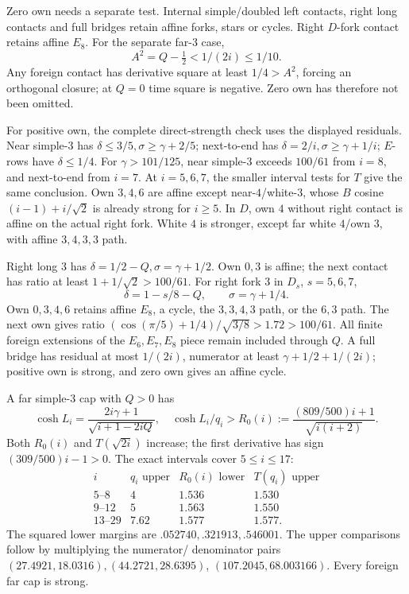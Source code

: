 \documentclass[11pt]{article}
\theoremstyle{definition}
\theoremstyle{remark}
\begin{document}
Zero own needs a separate test. Internal simple/doubled left
contacts, right long contacts and full bridges retain affine
forks, stars or cycles. Right \(D\)-fork contact retains
affine \(E_8\). For the separate far-\(3\) case,
\[
 A^2=Q-\tfrac12<1/(2i)\leq1/10.
\]
Any foreign contact has derivative square at least \(1/4>A^2\),
forcing an orthogonal closure; at \(Q=0\) time square is
negative. Zero own has therefore not been omitted.

For positive own, the complete direct-strength check uses
the displayed residuals. Near simple-\(3\) has
\(\delta\leq3/5,\sigma\geq\gamma+2/5\);
next-to-end has \(\delta=2/i,\sigma\geq\gamma+1/i\);
\(E\)-rows have \(\delta\leq1/4\).
For \(\gamma>101/125\), near simple-\(3\) exceeds
\(100/61\) from \(i=8\), and next-to-end from \(i=7\).
At \(i=5,6,7\), the smaller interval tests for \(T\)
give the same conclusion. Own \(3,4,6\) are affine
except near-\(4\)/white-\(3\), whose \(B\) cosine
\((i-1)+i/\sqrt2\) is already strong for \(i\geq5\).
In \(D\), own \(4\) without right contact is affine on
the actual right fork. White \(4\) is stronger, except
far white \(4\)/own \(3\), with affine \(3,4,3,3\) path.

Right long \(3\) has
\(\delta=1/2-Q,\sigma=\gamma+1/2\).
Own \(0,3\) is affine; the next contact has ratio
at least \(1+1/\sqrt2>100/61\).
For right fork \(3\) in \(D_s\), \(s=5,6,7\),
\[
 \delta=1-s/8-Q,\qquad \sigma=\gamma+1/4.
\]
Own \(0,3,4,6\) retains affine \(E_8\), a cycle,
the \(3,3,4,3\) path, or the \(6,3\) path.
The next own gives ratio
\((\cos(\pi/5)+1/4)/\sqrt{3/8}>1.72>100/61\).
All finite foreign extensions of the \(E_6,E_7,E_8\)
piece remain included through \(Q\).
A full bridge has residual at most \(1/(2i)\),
numerator at least \(\gamma+1/2+1/(2i)\);
positive own is strong, and zero own gives an affine cycle.

A far simple-\(3\) cap with \(Q>0\) has
\[
 \cosh L_i=\frac{2i\gamma+1}{\sqrt{i+1-2iQ}},\quad
 \cosh L_i/q_i>R_0(i)
 :=\frac{(809/500)i+1}{\sqrt{i(i+2)}}.
\]
Both \(R_0(i)\) and \(T(\sqrt{2i})\) increase;
the first derivative has sign \((309/500)i-1>0\).
The exact intervals cover \(5\leq i\leq17\):
\[
\begin{array}{c|c|c|c}
i&q_i\text{ upper}&R_0(i)\text{ lower}&T(q_i)\text{ upper}\\ \hline
5\text{--}8&4&1.536&1.530\\
9\text{--}12&5&1.563&1.550\\
13\text{--}29&7.62&1.577&1.577.
\end{array}
\]
The squared lower margins are \(.052740,.321913,.546001\).
The upper comparisons follow by multiplying the numerator/
denominator pairs
\((27.4921,18.0316),(44.2721,28.6395)\),
\((107.2045,68.003166)\).
Every foreign far cap is strong.
\end{document}
